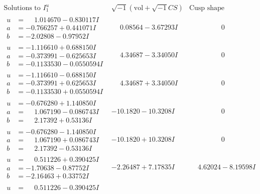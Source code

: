 \documentclass[1p]{elsarticle_modified}
\theoremstyle{definition}
\newcommand{\I}{\sqrt{-1}}
\begin{document}
$$\begin{array}{c|c|c}
\text{Solutions to }I^u_{1}& \I (\text{vol} + \sqrt{-1}CS) & \text{Cusp shape}\\
 \hline 
\begin{aligned}
u &= \phantom{-}1.014670 - 0.830117 I \\
a &= -0.766257 + 0.441071 I \\
b &= -2.02808 - 0.97952 I\end{aligned}
 & \phantom{-}0.08564 - 3.67293 I & \phantom{-0.000000 } 0 \\ \hline\begin{aligned}
u &= -1.116610 + 0.688150 I \\
a &= -0.373991 - 0.625653 I \\
b &= -0.1133530 - 0.0550594 I\end{aligned}
 & \phantom{-}4.34687 - 3.34050 I & \phantom{-0.000000 } 0 \\ \hline\begin{aligned}
u &= -1.116610 - 0.688150 I \\
a &= -0.373991 + 0.625653 I \\
b &= -0.1133530 + 0.0550594 I\end{aligned}
 & \phantom{-}4.34687 + 3.34050 I & \phantom{-0.000000 } 0 \\ \hline\begin{aligned}
u &= -0.676280 + 1.140850 I \\
a &= \phantom{-}1.067190 - 0.086743 I \\
b &= \phantom{-}2.17392 + 0.53136 I\end{aligned}
 & -10.1820 - 10.3208 I & \phantom{-0.000000 } 0 \\ \hline\begin{aligned}
u &= -0.676280 - 1.140850 I \\
a &= \phantom{-}1.067190 + 0.086743 I \\
b &= \phantom{-}2.17392 - 0.53136 I\end{aligned}
 & -10.1820 + 10.3208 I & \phantom{-0.000000 } 0 \\ \hline\begin{aligned}
u &= \phantom{-}0.511226 + 0.390425 I \\
a &= -1.70638 - 0.87752 I \\
b &= -2.16463 + 0.33752 I\end{aligned}
 & -2.26487 + 7.17835 I & \phantom{-}4.62024 - 8.19598 I \\ \hline\begin{aligned}
u &= \phantom{-}0.511226 - 0.390425 I \\

\end{aligned}
\end{array}$$
\end{document}
